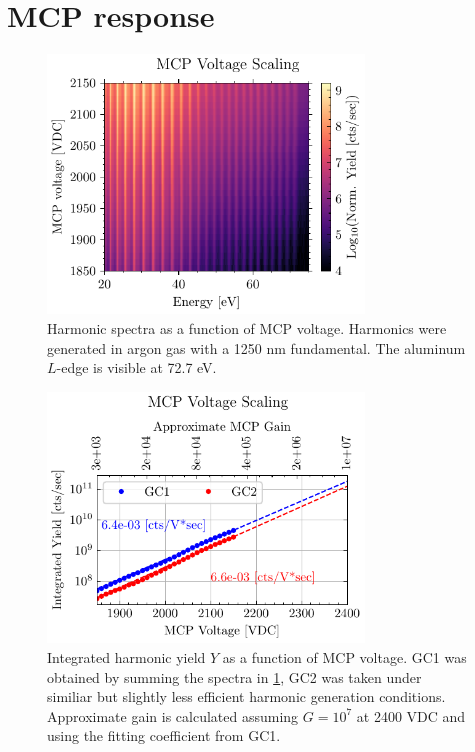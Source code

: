 \section{MCP response}

\begin{figure}
	\centering
	\includegraphics[width=0.75\textwidth]{figures/chap3/MCP_voltage_spectro.pdf}
	\caption{Harmonic spectra as a function of MCP voltage. Harmonics were generated in argon gas with a 1250 nm fundamental. The aluminum $L$-edge is visible at 72.7 eV.}
	\label{fig:MCP_voltage_spectro}
\end{figure}

\begin{figure}
	\centering
	\includegraphics[width=0.75\textwidth]{figures/chap3/MCP_voltage_sum.pdf}
	\caption{Integrated harmonic yield $Y$ as a function of MCP voltage. GC1 was obtained by summing the spectra in \cref{fig:MCP_voltage_spectro}, GC2 was taken under similiar but slightly less efficient harmonic generation conditions. Approximate gain is calculated assuming $G = 10^7$ at 2400 VDC and using the fitting coefficient from GC1.}
	\label{fig:MCP_voltage_sumo}
\end{figure}


